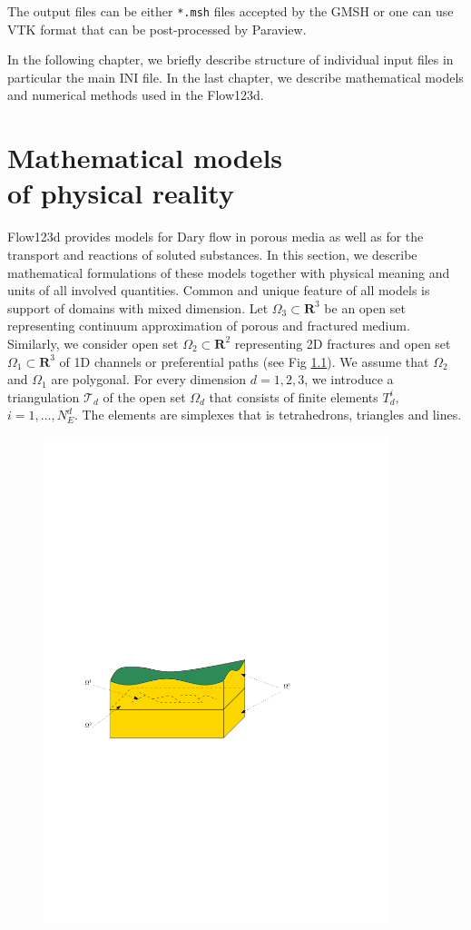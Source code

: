 \documentclass[12pt,a4paper]{report}
\def\Real{{\mathbf R}}
\begin{document}
The output files can be either \verb'*.msh' files accepted by the GMSH or one can use VTK format that can be post-processed by Paraview.

In the following chapter, we briefly describe structure of individual input files in particular the main INI file. In the last chapter, we describe
mathematical models and numerical methods used in the Flow123d.


\chapter{Mathematical models \\of physical reality}

Flow123d provides models for Dary flow in porous media as well as for the transport and reactions of soluted substances. In this section, we describe 
mathematical formulations of these models together with physical meaning and units of all involved quantities. Common and unique feature of all models is support of
domains with mixed dimension. Let $\Omega_{3} \subset \Real^3$ be an open set representing continuum approximation of porous and fractured medium.
Similarly, we consider open set $\Omega_2\subset \Real^2$ representing 2D fractures and open set $\Omega_1\subset \Real^3$ of 1D channels or preferential paths 
(see Fig \ref{fig:multi-dim}).
We assume that $\Omega_2$ and $\Omega_1$ are polygonal. For every dimension $d=1,2,3$, we introduce a triangulation $\mathcal{T}_{d}$ of the open set $\Omega_d$
that consists of finite elements $T_{d}^{i},$\ $i = 1,\dots,N_{E}^{d}$. The elements are simplexes that is tetrahedrons, triangles and lines.

\begin{figure}[h]
\centering
\includegraphics[width=10cm]{ground_fractures}
\label{fig:multi-dim}
\end{figure}
\end{document}
